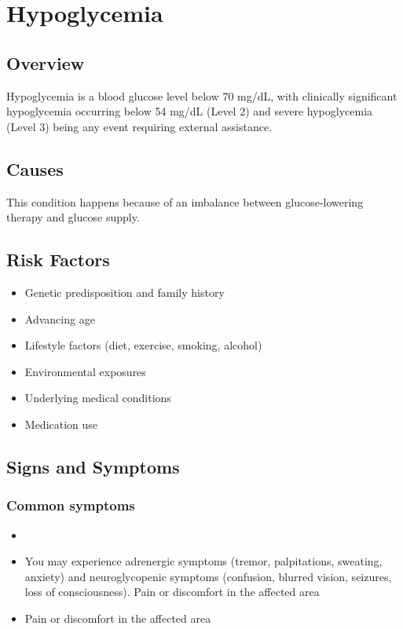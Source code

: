 \chapter{Hypoglycemia}
\label{sec:Hypoglycemia}

\section{Overview}
Hypoglycemia is a blood glucose level below 70 mg/dL, with clinically significant hypoglycemia occurring below 54 mg/dL (Level 2) and severe hypoglycemia (Level 3) being any event requiring external assistance.
\section{Causes}
This condition happens because of an imbalance between glucose-lowering therapy and glucose supply.     
\section{Risk Factors}

\begin{itemize}[noitemsep]
  \item Genetic predisposition and family history
  \item Advancing age
  \item Lifestyle factors (diet, exercise, smoking, alcohol)
  \item Environmental exposures
  \item Underlying medical conditions
  \item Medication use
\end{itemize}
\section{Signs and Symptoms}

\subsection{Common symptoms}
\begin{itemize}[noitemsep]
  \item \item You may experience adrenergic symptoms (tremor, palpitations, sweating, anxiety) and neuroglycopenic symptoms (confusion, blurred vision, seizures, loss of consciousness). Pain or discomfort in the affected area    \item Pain or discomfort in the affected area
  \end{itemize}

